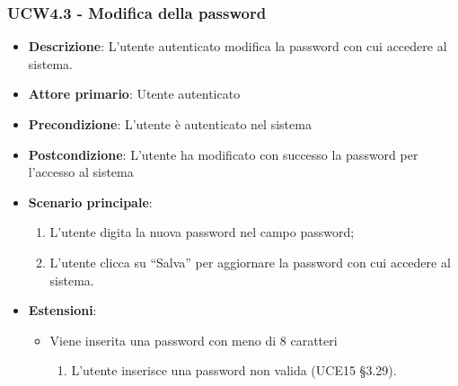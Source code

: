 \subsubsection{UCW4.3 - Modifica della password}
\begin{itemize}
\item \textbf{Descrizione}: L'utente autenticato modifica la password con cui accedere al sistema.
\item \textbf{Attore primario}: Utente autenticato
\item \textbf{Precondizione}: L’utente è autenticato nel sistema
\item \textbf{Postcondizione}: L’utente ha modificato con successo la password per l’accesso al sistema

\item \textbf{Scenario principale}:
\begin{enumerate}
\item L’utente digita la nuova password nel campo password;
\item L’utente clicca su “Salva” per aggiornare la password con cui accedere al sistema.
\end{enumerate}

\item \textbf{Estensioni}:
\begin{itemize}
\item Viene inserita una password con meno di 8 caratteri
\begin{enumerate}
	\item L'utente inserisce una password non valida (UCE15 §3.29).
\end{enumerate}
\end{itemize}
\end{itemize}

\pagebreak